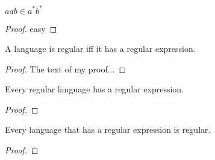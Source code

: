 %

\begin{theorem}\label{thm:my_example_theorem}
\leanok
$aab \in a^* b^*$
\end{theorem}
\begin{proof}
\leanok
easy
\end{proof}


\begin{theorem}\label{thm:regular_iff_regexp}
A language is regular iff it has a regular expression.
\end{theorem}
\begin{proof}
{}
The text of my proof...
\end{proof}

\begin{lemma}\label{lem:regular_impl_regexp}
Every regular language has a regular expression.
\end{lemma}
\begin{proof}
\end{proof}

\begin{lemma}\label{lem:regexp_impl_regular}
Every language that has a regular expression is regular.
\end{lemma}
\begin{proof}
\end{proof}
